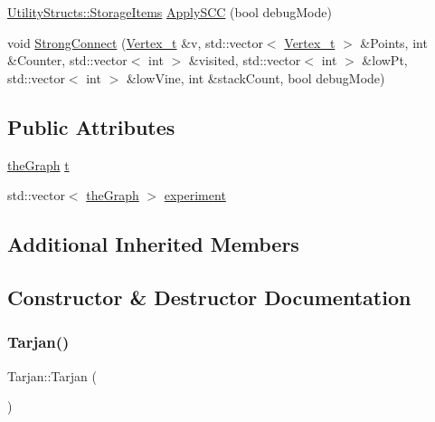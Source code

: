 \begin{DoxyCompactItemize}
\item 
\hyperlink{struct_utility_structs_1_1_storage_items}{Utility\+Structs\+::\+Storage\+Items} \hyperlink{class_tarjan_a58ad9fcfd599a608fa1671e4607db378_a58ad9fcfd599a608fa1671e4607db378}{Apply\+S\+CC} (bool debug\+Mode)
\item 
void \hyperlink{class_tarjan_ac76fd1419a2de2dbf34c6ff1d4cc55e2_ac76fd1419a2de2dbf34c6ff1d4cc55e2}{Strong\+Connect} (\hyperlink{class_graph_component_ae67114a6ce5a001dc35e1996e1b45aa0_ae67114a6ce5a001dc35e1996e1b45aa0}{Vertex\+\_\+t} \&v, std\+::vector$<$ \hyperlink{class_graph_component_ae67114a6ce5a001dc35e1996e1b45aa0_ae67114a6ce5a001dc35e1996e1b45aa0}{Vertex\+\_\+t} $>$ \&Points, int \&Counter, std\+::vector$<$ int $>$ \&visited, std\+::vector$<$ int $>$ \&low\+Pt, std\+::vector$<$ int $>$ \&low\+Vine, int \&stack\+Count, bool debug\+Mode)
\end{DoxyCompactItemize}
\subsection*{Public Attributes}
\begin{DoxyCompactItemize}
\item 
\hyperlink{class_graph_component_a982e0748a6e1b8dc74986f5f8b3dca5c_a982e0748a6e1b8dc74986f5f8b3dca5c}{the\+Graph} \hyperlink{class_tarjan_a54b0703f885a3514ea0bf4cdbc7fdaad_a54b0703f885a3514ea0bf4cdbc7fdaad}{t}
\item 
std\+::vector$<$ \hyperlink{class_graph_component_a982e0748a6e1b8dc74986f5f8b3dca5c_a982e0748a6e1b8dc74986f5f8b3dca5c}{the\+Graph} $>$ \hyperlink{class_tarjan_aaa327f105a07f07648dcc6f62a565986_aaa327f105a07f07648dcc6f62a565986}{experiment}
\end{DoxyCompactItemize}
\subsection*{Additional Inherited Members}


\subsection{Constructor \& Destructor Documentation}
\mbox{\label{class_tarjan_a24a7fa59ed2fcff4a520e012e30acb91_a24a7fa59ed2fcff4a520e012e30acb91}} 
\subsubsection{\texorpdfstring{Tarjan()}{Tarjan()}\hspace{0.1cm}{\footnotesize\ttfamily [1/2]}}
{\footnotesize\ttfamily Tarjan\+::\+Tarjan (\begin{DoxyParamCaption}{ }\end{DoxyParamCaption})\hspace{0.3cm}{\ttfamily [inline]}}


